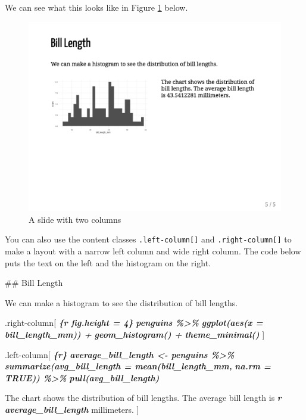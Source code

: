 \documentclass[
]{book}
\newenvironment{Shaded}{\begin{snugshade}}{\end{snugshade}}
\newcommand{\FunctionTok}[1]{\textcolor[rgb]{0.00,0.00,0.00}{#1}}
\newcommand{\InformationTok}[1]{\textcolor[rgb]{0.56,0.35,0.01}{\textbf{\textit{#1}}}}
\newcommand{\NormalTok}[1]{#1}
\begin{document}
We can see what this looks like in Figure \ref{fig:slide-two-columns} below.

\begin{figure}
\includegraphics[width=1\linewidth]{assets/slide-two-columns} \caption{A slide with two columns}\label{fig:slide-two-columns}
\end{figure}

You can also use the content classes \texttt{.left-column{[}{]}} and \texttt{.right-column{[}{]}} to make a layout with a narrow left column and wide right column. The code below puts the text on the left and the histogram on the right.

\begin{Shaded}
\begin{Highlighting}[]
\FunctionTok{\#\# Bill Length}

\NormalTok{We can make a histogram to see the distribution of bill lengths.}

\NormalTok{.right{-}column[}
\InformationTok{\textasciigrave{}\textasciigrave{}\textasciigrave{}\{r fig.height = 4\}}
\InformationTok{penguins \%\textgreater{}\% }
\InformationTok{  ggplot(aes(x = bill\_length\_mm)) +}
\InformationTok{  geom\_histogram() +}
\InformationTok{  theme\_minimal()}
\InformationTok{\textasciigrave{}\textasciigrave{}\textasciigrave{}}
\NormalTok{]}

\NormalTok{.left{-}column[}
\InformationTok{\textasciigrave{}\textasciigrave{}\textasciigrave{}\{r\}}
\InformationTok{average\_bill\_length \textless{}{-} penguins \%\textgreater{}\% }
\InformationTok{  summarize(avg\_bill\_length = mean(bill\_length\_mm,}
\InformationTok{                                   na.rm = TRUE)) \%\textgreater{}\% }
\InformationTok{  pull(avg\_bill\_length)}
\InformationTok{\textasciigrave{}\textasciigrave{}\textasciigrave{}}

\NormalTok{The chart shows the distribution of bill lengths. The average bill length is }\InformationTok{\textasciigrave{}r average\_bill\_length\textasciigrave{}}\NormalTok{ millimeters.}
\NormalTok{]}
\end{Highlighting}
\end{Shaded}
\end{document}
